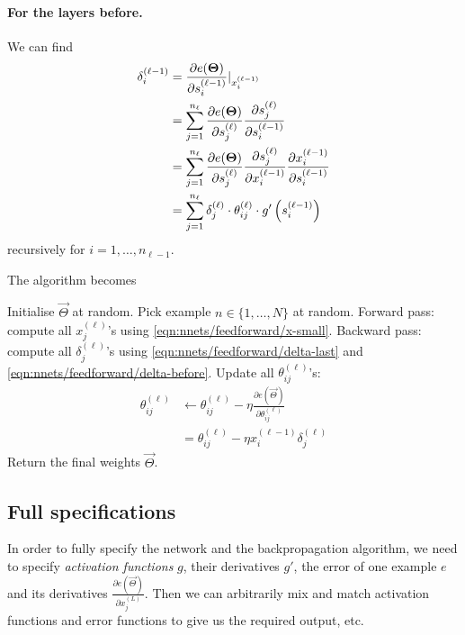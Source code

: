 \paragraph{For the layers before.} We can find
\begin{align}
    \delta_i^{(\ell - 1)}   &= \frac{\partial e(\boldsymbol{\mathbf{\Theta}})}{\partial s_i^{(\ell - 1)}}|_{x_i^{(\ell - 1)}} \\
                            &= \sum_{j = 1}^{n_\ell} \frac{\partial e(\boldsymbol{\mathbf{\Theta}})}{\partial s_j^{(\ell)}} \frac{\partial s_j^{(\ell)}}{\partial s_i^{(\ell - 1)}} \\
                            &= \sum_{j = 1}^{n_\ell} \frac{\partial e(\boldsymbol{\mathbf{\Theta}})}{\partial s_j^{(\ell)}} \frac{\partial s_j^{(\ell)}}{\partial x_i^{(\ell - 1)}} \frac{\partial x_i^{(\ell - 1)}}{\partial s_i^{(\ell - 1)}} \\
                            &= \sum_{j = 1}^{n_\ell} \delta_j^{(\ell)} \cdot \theta_{ij}^{(\ell)} \cdot g'\left(s_i^{(\ell - 1)}\right) \label{eqn:nnets/feedforward/delta-before}
\end{align}
recursively for $i = 1, \dotsc, n_{\ell - 1}$.

The algorithm becomes
\begin{algorithmbis}\label{alg:nnets/feedforward/backprop}
    \begin{algorithmic}[1]
        \State Initialise $\vec \Theta$ at random.
        \Repeat
            \State Pick example $n \in \{1, \dotsc, N\}$ at random.
            \State Forward pass: compute all $x_j^{(\ell)}$'s using \eqref{eqn:nnets/feedforward/x-small}.
            \State Backward pass: compute all $\delta_j^{(\ell)}$'s using \eqref{eqn:nnets/feedforward/delta-last} and \eqref{eqn:nnets/feedforward/delta-before}.
            \State Update all $\theta_{ij}^{(\ell)}$'s:
                \begin{align}
                    \theta_{ij}^{(\ell)}    &\leftarrow \theta_{ij}^{(\ell)} - \eta\frac{\partial e(\vec \Theta)}{\partial \theta_{ij}^{(\ell)}} \\
                                            &= \theta_{ij}^{(\ell)} - \eta x_i^{(\ell - 1)} \delta_j^{(\ell)}
                \end{align}
        \State Return the final weights $\vec \Theta$.
    \end{algorithmic}
\end{algorithmbis}

\subsection{Full specifications}
In order to fully specify the network and the backpropagation algorithm, we need to specify \emph{activation functions} $g$, their derivatives $g'$, the error of one example $e$ and its derivatives $\frac{\partial e(\vec \Theta)}{\partial x_j^{(L)}}$. Then we can arbitrarily mix and match activation functions and error functions to give us the required output, etc.

